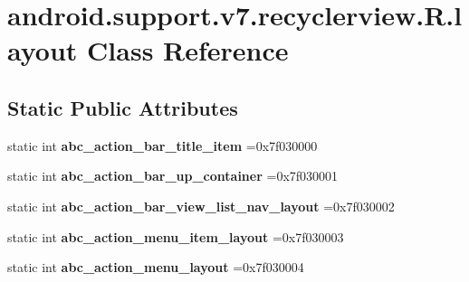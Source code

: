 \hypertarget{classandroid_1_1support_1_1v7_1_1recyclerview_1_1R_1_1layout}{}\section{android.\+support.\+v7.\+recyclerview.\+R.\+layout Class Reference}
\label{classandroid_1_1support_1_1v7_1_1recyclerview_1_1R_1_1layout}
\subsection*{Static Public Attributes}
\begin{DoxyCompactItemize}
\item 
\mbox{\label{classandroid_1_1support_1_1v7_1_1recyclerview_1_1R_1_1layout_af2d6ec355b18a6548cc3faa0e5c79d3e}} 
static int {\bfseries abc\+\_\+action\+\_\+bar\+\_\+title\+\_\+item} =0x7f030000
\item 
\mbox{\label{classandroid_1_1support_1_1v7_1_1recyclerview_1_1R_1_1layout_ab685399596450fe075b8c15a4aa4a2e1}} 
static int {\bfseries abc\+\_\+action\+\_\+bar\+\_\+up\+\_\+container} =0x7f030001
\item 
\mbox{\label{classandroid_1_1support_1_1v7_1_1recyclerview_1_1R_1_1layout_a41b4323a801c0ca557a4ab051e4716a6}} 
static int {\bfseries abc\+\_\+action\+\_\+bar\+\_\+view\+\_\+list\+\_\+nav\+\_\+layout} =0x7f030002
\item 
\mbox{\label{classandroid_1_1support_1_1v7_1_1recyclerview_1_1R_1_1layout_ad0df2f3a6b74e9a94c6c857f1554207f}} 
static int {\bfseries abc\+\_\+action\+\_\+menu\+\_\+item\+\_\+layout} =0x7f030003
\item 
\mbox{\label{classandroid_1_1support_1_1v7_1_1recyclerview_1_1R_1_1layout_ab160d3b976494953e200980012b27bd6}} 
static int {\bfseries abc\+\_\+action\+\_\+menu\+\_\+layout} =0x7f030004
\item 
\mbox{\label{classandroid_1_1support_1_1v7_1_1recyclerview_1_1R_1_1layout_a9bb1d9344f9955be86e94de95f8a5741}} 

\end{DoxyCompactItemize}
